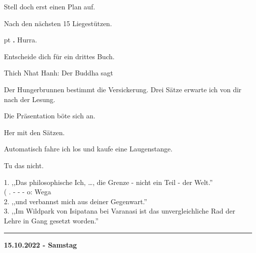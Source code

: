 \documentclass[10pt,a4paper]{article}
\newcounter{notec}
\newcommand\notep[1]{%
  \stepcounter{notec}
  \vskip #1pt
  {\bf\arabic{notec}.}
}
\newcommand\rele[1] {{\color {english} \bf {#1}}}         %
\newcommand\ddivide {\vskip -9pt \hrule \vskip 6pt}
\begin{document}
\begin{mdframed}[style=daystyle]
  \vskip 2pt
  Stell doch erst einen Plan auf.

  \vskip 2pt
  Nach den nächsten 15 Liegestützen.


  \notep 4 Hurra.

  \vskip 2pt
  Entscheide dich für ein drittes Buch.

  \vskip 2pt
  Thich Nhat Hanh: Der Buddha sagt

  \vskip 2pt
  Der Hungerbrunnen bestimmt die Versickerung. Drei Sätze erwarte ich von dir
  nach der Lesung.

  \vskip 2pt
  Die Präsentation böte sich an.

  \vskip 2pt
  Her mit den Sätzen.

  \vskip 2pt
  Automatisch fahre ich los und kaufe eine Laugenstange.

  \vskip 2pt
  Tu das nicht.

  \vskip 2pt
  1. ,,Das philosophische Ich, …, die Grenze - nicht ein Teil - der Welt.'' \\
  ( . - - - o: Wega \\
  2. ,,und verbannst mich aus deiner Gegenwart.'' \\
  3. ,,Im Wildpark von Isipatana bei Varanasi ist das unvergleichliche Rad der
  Lehre in Gang gesetzt worden.''

\end{mdframed}


\ddivide
{\rele {15.10.2022 - Samstag}}
       
\end{document}
